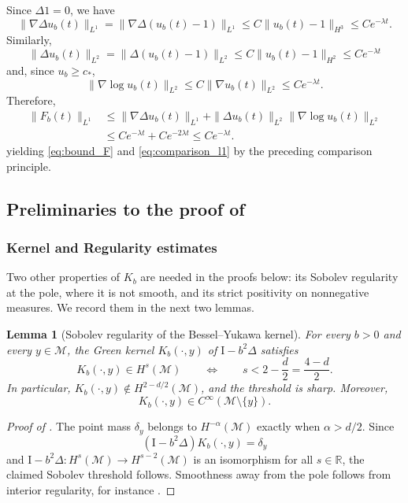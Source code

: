 \documentclass[11pt]{article}
\newtheorem{lemma}[theorem]{Lemma}
\theoremstyle{definition}
\def\M{\mathcal M}
\def\I{\mathrm{I}}
\begin{document}
Since
\(\Delta 1=0\), we have
\[
\|\nabla\Delta u_b(t)\|_{L^1}
=
\|\nabla\Delta(u_b(t)-1)\|_{L^1}
\le
C\|u_b(t)-1\|_{H^3}
\le
Ce^{-\lambda t}.
\]
Similarly,
\[
\|\Delta u_b(t)\|_{L^2}
=
\|\Delta(u_b(t)-1)\|_{L^2}
\le
C\|u_b(t)-1\|_{H^2}
\le
Ce^{-\lambda t}
\]
and, since $u_b\geq c_*$,
\[
\|\nabla\log u_b(t)\|_{L^2}
\le
C\|\nabla u_b(t)\|_{L^2}
\le
Ce^{-\lambda t}.
\]
Therefore, 
\[
\begin{aligned}
\|F_b(t)\|_{L^1}
&\le
\|\nabla\Delta u_b(t)\|_{L^1}
+
\|\Delta u_b(t)\|_{L^2}
\|\nabla\log u_b(t)\|_{L^2}  \\
&\le
Ce^{-\lambda t}
+
Ce^{-2\lambda t}
\le
Ce^{-\lambda t}.
\end{aligned}
\]
yielding \eqref{eq:bound_F} and \eqref{eq:comparison_l1} by the preceding comparison principle. 




\subsection{Preliminaries to the proof of }
\label{sec:preliminaries}
\subsubsection{Kernel and Regularity estimates}

Two other properties of $K_b$ are needed in the proofs below: its Sobolev regularity at
the pole, where it is not smooth, and its strict positivity on nonnegative
measures. We record them in the next two lemmas.

\begin{lemma}[Sobolev regularity of the Bessel--Yukawa kernel]\label{lem:Kb_kernel_sobolev}
For every $b>0$ and every $y\in \M$, the Green kernel
$K_b(\cdot,y)$ of $\I-b^2\Delta$ satisfies
\[
K_b(\cdot,y)\in H^s( \M)
\qquad\Longleftrightarrow\qquad
s<2-\frac{ d}{2}=\frac{ 4-d}{2}.
\]
In particular, $K_b(\cdot,y)\notin H^{2- d/2}( \M)$, and the
threshold is sharp. Moreover,
\[
K_b(\cdot,y)\in C^\infty( \M\setminus\{y\}).
\]
\end{lemma}

\begin{proof}[Proof of ]
The point mass $\delta_y$ belongs to $H^{-\alpha}(\M)$ exactly when
$\alpha> d/2$. Since
\[
(\I-b^2\Delta)K_b(\cdot,y)=\delta_y
\]
and $\I-b^2\Delta:H^s(\M)\to H^{s-2}(\M)$ is an
isomorphism for all $s\in\mathbb R$, the claimed Sobolev threshold follows.
Smoothness away from the pole follows from interior regularity, for instance
\cite[Theorem~6.17]{gilbarg_trudinger_2001}.
\end{proof}
\end{document}

